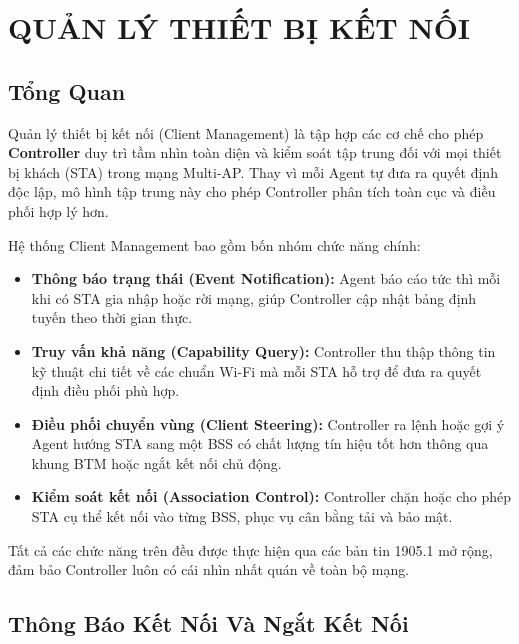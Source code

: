 \chapter{QUẢN LÝ THIẾT BỊ KẾT NỐI}
\label{chapter:chapter-6}

\section{Tổng Quan}

Quản lý thiết bị kết nối (Client Management) là tập hợp các cơ chế cho phép
\textbf{Controller} duy trì tầm nhìn toàn diện và kiểm soát tập trung đối với mọi
thiết bị khách (STA) trong mạng Multi-AP. Thay vì mỗi Agent tự đưa ra quyết
định độc lập, mô hình tập trung này cho phép Controller phân tích toàn cục và điều
phối hợp lý hơn.

Hệ thống Client Management bao gồm bốn nhóm chức năng chính:
\begin{itemize}
	\item \textbf{Thông báo trạng thái (Event Notification):} Agent báo cáo tức thì
	mỗi khi có STA gia nhập hoặc rời mạng, giúp Controller cập nhật bảng định
	tuyến theo thời gian thực.
	\item \textbf{Truy vấn khả năng (Capability Query):} Controller thu thập thông tin
	kỹ thuật chi tiết về các chuẩn Wi-Fi mà mỗi STA hỗ trợ để đưa ra quyết định
	điều phối phù hợp.
	\item \textbf{Điều phối chuyển vùng (Client Steering):} Controller ra lệnh hoặc
	gợi ý Agent hướng STA sang một BSS có chất lượng tín hiệu tốt hơn thông qua
	khung BTM hoặc ngắt kết nối chủ động.
	\item \textbf{Kiểm soát kết nối (Association Control):} Controller chặn hoặc cho
	phép STA cụ thể kết nối vào từng BSS, phục vụ cân bằng tải và bảo mật.
\end{itemize}

Tất cả các chức năng trên đều được thực hiện qua các bản tin 1905.1 mở rộng, đảm bảo
Controller luôn có cái nhìn nhất quán về toàn bộ mạng.


\section{Thông Báo Kết Nối Và Ngắt Kết Nối}


